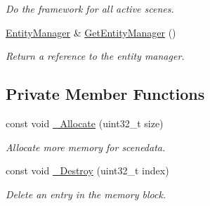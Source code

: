 \begin{DoxyCompactItemize}
\begin{DoxyCompactList}\small\item\em Do the framework for all active scenes. \end{DoxyCompactList}\item 
\hyperlink{class_ensum_1_1_components_1_1_entity_manager}{Entity\+Manager} \& \hyperlink{class_ensum_1_1_components_1_1_scene_manager_a7fdc5d47c5b8fe03807fe472b038a56f}{Get\+Entity\+Manager} ()\hypertarget{class_ensum_1_1_components_1_1_scene_manager_a7fdc5d47c5b8fe03807fe472b038a56f}{}\label{class_ensum_1_1_components_1_1_scene_manager_a7fdc5d47c5b8fe03807fe472b038a56f}

\begin{DoxyCompactList}\small\item\em Return a reference to the entity manager. \end{DoxyCompactList}\end{DoxyCompactItemize}
\subsection*{Private Member Functions}
\begin{DoxyCompactItemize}
\item 
const void \hyperlink{class_ensum_1_1_components_1_1_scene_manager_a383a468319c93280ce8ac0bbb920ab87}{\+\_\+\+Allocate} (uint32\+\_\+t size)
\begin{DoxyCompactList}\small\item\em Allocate more memory for scenedata. \end{DoxyCompactList}\item 
const void \hyperlink{class_ensum_1_1_components_1_1_scene_manager_a8102cfd9f4fed62a06e564dc016b6c46}{\+\_\+\+Destroy} (uint32\+\_\+t index)
\begin{DoxyCompactList}\small\item\em Delete an entry in the memory block. \end{DoxyCompactList}\end{DoxyCompactItemize}
